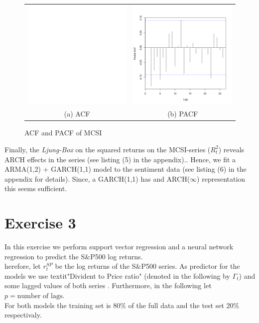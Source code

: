 \documentclass[fleqn]{article}
\begin{document}
\begin{figure}[!htb]
\centering
\begin{tabular}{cc}
		\includegraphics[width=60mm]{p3.png} &   \includegraphics[width=60mm]{p4.png} \\
		(a) ACF  & (b) PACF  \\[4pt]
\end{tabular}
\caption{ACF and PACF of MCSI}
\end{figure}

Finally, the \textit{Ljung-Box} on the squared returns on the MCSI-series ($R^2_t$) reveals ARCH effects in the series (see listing (5) in the appendix).. Hence, we fit a ARMA(1,2) + GARCH(1,1) model to the sentiment data (see listing (6) in the appendix for details). Since, a GARCH(1,1) has and ARCH($\infty$) representation this seems sufficient. 

\pagebreak

\section*{Exercise 3}

In this exercise we perform support vector regression and a neural network regression to predict the S\&P500 log returns.\\
 herefore, let $r_t^{SP}$ be the log returns of the S\&P500 series. As predictor for the models we use textit{"Divident to Price ratio"} (denoted in the following by $\Gamma_t$) and some lagged values of both series . Furthermore, in the following let $p=\text{number of lags}$. \\
 For both models the training set is 80\% of the full data and the test set 20\% respectivaly. 
\end{document}
